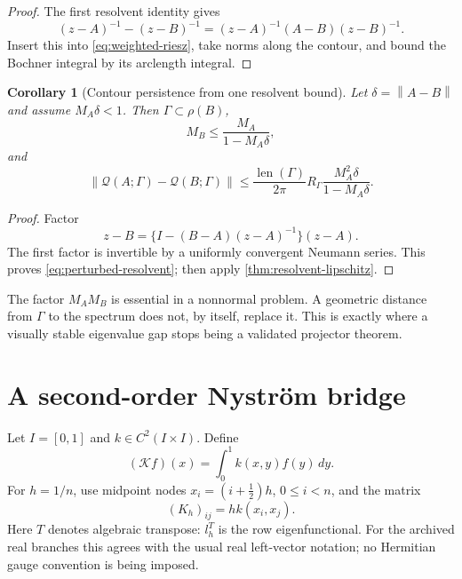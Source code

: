 \documentclass[11pt]{article}
\newtheorem{corollary}[theorem]{Corollary}
\theoremstyle{definition}
\theoremstyle{remark}
\newcommand{\norm}[1]{\left\lVert #1\right\rVert}
\newcommand{\cK}{\mathcal K}
\newcommand{\cQ}{\mathcal Q}
\newcommand{\len}{\operatorname{len}}
\begin{document}
\begin{proof}
The first resolvent identity gives
\[
 (z-A)^{-1}-(z-B)^{-1}
 =(z-A)^{-1}(A-B)(z-B)^{-1}.
\]
Insert this into \eqref{eq:weighted-riesz}, take norms along the contour, and
bound the Bochner integral by its arclength integral.
\end{proof}

\begin{corollary}[Contour persistence from one resolvent bound]
\label{cor:contour-persistence}
Let
$\delta=\norm{A-B}$ and assume $M_A\delta<1$.  Then
$\Gamma\subset\rho(B)$,
\begin{equation}
 M_B\le\frac{M_A}{1-M_A\delta},
 \label{eq:perturbed-resolvent}
\end{equation}
and
\begin{equation}
 \norm{\cQ(A;\Gamma)-\cQ(B;\Gamma)}
 \le
 \frac{\len(\Gamma)}{2\pi}R_\Gamma
 \frac{M_A^2\delta}{1-M_A\delta}.
 \label{eq:one-sided-transfer}
\end{equation}
\end{corollary}

\begin{proof}
Factor
\[
 z-B=\{I-(B-A)(z-A)^{-1}\}(z-A).
\]
The first factor is invertible by a uniformly convergent Neumann series.
This proves \eqref{eq:perturbed-resolvent}; then apply
\cref{thm:resolvent-lipschitz}.
\end{proof}

The factor $M_AM_B$ is essential in a nonnormal problem.  A geometric
distance from $\Gamma$ to the spectrum does not, by itself, replace it.
This is exactly where a visually stable eigenvalue gap stops being a
validated projector theorem.

\section{A second-order Nystr\"om bridge}
\label{sec:nystrom}

Let $I=[0,1]$ and $k\in C^2(I\times I)$.  Define
\begin{equation}
 (\cK f)(x)=\int_0^1k(x,y)f(y)\,dy.
 \label{eq:continuum-operator}
\end{equation}
For $h=1/n$, use midpoint nodes
$x_i=(i+\tfrac12)h$, $0\le i<n$, and the matrix
\begin{equation}
 (K_h)_{ij}=h k(x_i,x_j).
 \label{eq:nystrom-matrix}
\end{equation}
Here $T$ denotes algebraic transpose: $l_h^T$ is the row eigenfunctional.
For the archived real branches this agrees with the usual real left-vector
notation; no Hermitian gauge convention is being imposed.
\end{document}

